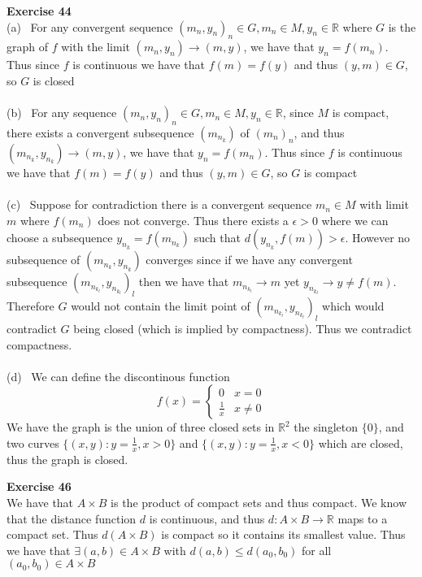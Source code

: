 \documentclass[12pt]{article}
\newenvironment{ques}[1]{\textbf{Exercise #1}\vspace{1 mm}\\ }{\bigskip}
\theoremstyle{definition}
\newcommand{\R}{\mathbb R}
\begin{document}
\begin{ques}{44}
	(a) \ For any convergent sequence $(m_n, y_n)_n \in G, m_n \in M,
	y_n \in \R$ where $G$ is the graph of $f$ with the limit $(m_n,y_n) \to
	(m,y)$, we have that $y_n = f(m_n)$. Thus since $f$ is continuous we have
	that $f(m) = f(y)$ and thus $(y,m) \in G$, so $G$ is closed\\
	\\
	(b) \ For any sequence $(m_n, y_n)_n \in G, m_n \in M,
	y_n \in \R$, since $M$ is compact, there exists a convergent subsequence
	$(m_{n_k})$ of $(m_n)_n$, and thus $(m_{n_k},y_{n_k}) \to
	(m,y)$, we have that $y_n = f(m_n)$. Thus since $f$ is continuous we have
	that $f(m) = f(y)$ and thus $(y,m) \in G$, so $G$ is compact\\
	\\
	(c) \ Suppose for contradiction there is a convergent sequence $m_n \in M$
	with limit $m$ where $f(m_n)$ does not converge. Thus there exists a
	$\epsilon > 0$ where we can choose a subsequence $y_{n_k} = f(m_{n_k})$
	such that $d(y_{n_k}, f(m)) > \epsilon$. However no subsequence of 
	$(m_{n_k}, y_{n_k})$ converges since if we have any convergent subsequence
	$(m_{n_{k_l}}, y_{n_{k_l}})_l$ then we have that $m_{n_{k_l}} \to m$ yet
	$y_{n_{k_l}} \to y \neq f(m)$. Therefore $G$ would not contain the limit
	point of $(m_{n_{k_l}}, y_{n_{k_l}})_l$ which would contradict $G$ being
	closed (which is implied by compactness).  Thus we contradict
	compactness.\\
	\\
	(d) \ We can define the discontinous function
	$$f(x) = \begin{cases} 
      0 & x = 0 \\
      \frac{1}{x} & x \neq 0
   \end{cases}$$
   We have the graph is the union of three closed sets in $\R^2$ the singleton
   $\{0\}$, and two curves $\{(x,y): y = \frac 1 x, x > 0\}$ and $\{(x,y): y =
   \frac 1 x, x < 0\}$ which are closed, thus the graph is closed.
\end{ques}

\begin{ques}{46}
	We have that $A \times B$ is the product of compact sets and thus compact.
	We know that the distance function $d$ is continuous, and thus $d: A \times
	B \to \R$ maps to a compact set. Thus $d(A \times B)$ is compact so it
	contains its smallest value. Thus we have that $\exists (a,b) \in A \times
	B$ with $d(a,b) \leq d(a_0,b_0)$ for all $(a_0,b_0) \in A \times B$\\
\end{ques}
\end{document}
